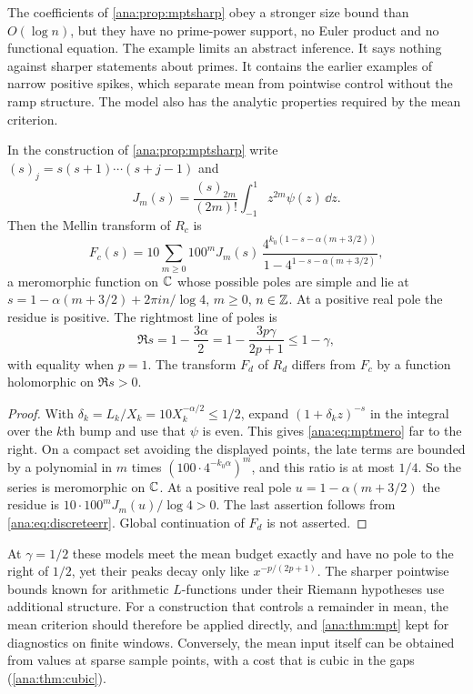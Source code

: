 The coefficients of \cref{ana:prop:mptsharp} obey a stronger size bound than $O(\log n)$, but
they have no prime-power support, no Euler product and no functional equation. The example
limits an abstract inference. It says nothing against sharper statements about primes. It
contains the earlier examples of narrow positive spikes, which separate mean from pointwise
control without the ramp structure. The model also has the analytic properties required by
the mean criterion.

\begin{proposition}\label{ana:prop:mptmero}
In the construction of \cref{ana:prop:mptsharp} write $(s)_j=s(s+1)\cdots(s+j-1)$ and
\[
 J_m(s)=\frac{(s)_{2m}}{(2m)!}\int_{-1}^1z^{2m}\psi(z)\,\dd z .
\]
Then the Mellin transform of $R_c$ is
\begin{equation}\label{ana:eq:mptmero}
 F_c(s)=10\sum_{m\ge0}100^mJ_m(s)\,
 \frac{4^{k_0(1-s-\alpha(m+3/2))}}{1-4^{1-s-\alpha(m+3/2)}} ,
\end{equation}
a meromorphic function on $\mathbb{C}$ whose possible poles are simple and lie at
$s=1-\alpha(m+3/2)+2\pi in/\log4$, $m\ge0$, $n\in\mathbb{Z}$. At a positive real pole the residue is
positive. The rightmost line of poles is
\[
 \Re s=1-\frac{3\alpha}2=1-\frac{3p\gamma}{2p+1}\le1-\gamma ,
\]
with equality when $p=1$. The transform $F_d$ of $R_d$ differs from $F_c$ by a function
holomorphic on $\Re s>0$.
\end{proposition}

\begin{proof}
With $\delta_k=L_k/X_k=10X_k^{-\alpha/2}\le1/2$, expand $(1+\delta_kz)^{-s}$ in the integral
over the $k$th bump and use that $\psi$ is even. This gives \eqref{ana:eq:mptmero} far to the
right. On a compact set avoiding the displayed points, the late terms are bounded by a
polynomial in $m$ times $(100\cdot4^{-k_0\alpha})^m$, and this ratio is at most $1/4$. So the
series is meromorphic on $\mathbb{C}$. At a positive real pole $u=1-\alpha(m+3/2)$ the residue is
$10\cdot100^mJ_m(u)/\log4>0$. The last assertion follows from \eqref{ana:eq:discreteerr}.
Global continuation of $F_d$ is not asserted.
\end{proof}

At $\gamma=1/2$ these models meet the mean budget exactly and have no pole to the right of
$1/2$, yet their peaks decay only like $x^{-p/(2p+1)}$. The sharper pointwise bounds known for
arithmetic $L$-functions under their Riemann hypotheses use additional structure. For a
construction that controls a remainder in mean, the mean criterion should therefore be applied
directly, and \cref{ana:thm:mpt} kept for diagnostics on finite windows. Conversely, the mean
input itself can be obtained from values at sparse sample points, with a cost that is cubic
in the gaps (\cref{ana:thm:cubic}).

